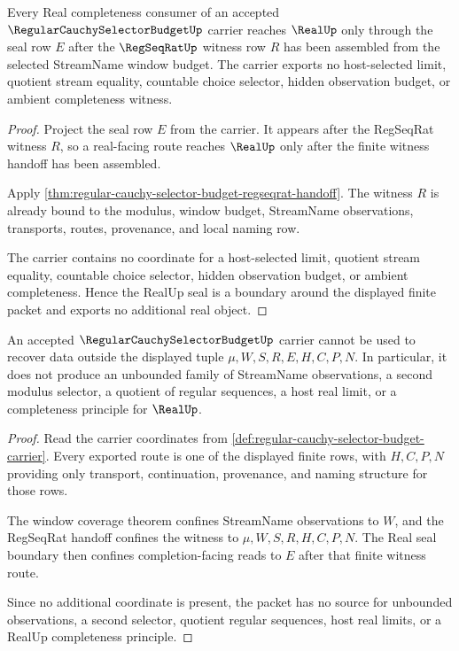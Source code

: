 \begin{theorem}
\label{thm:regular-cauchy-selector-budget-real-seal-boundary}
Every Real completeness consumer of an accepted $\RegularCauchySelectorBudgetUp$ carrier reaches $\RealUp$ only through the seal row $E$ after the $\RegSeqRatUp$ witness row $R$ has been assembled from the selected StreamName window budget. The carrier exports no host-selected limit, quotient stream equality, countable choice selector, hidden observation budget, or ambient completeness witness.
\end{theorem}
\begin{proof}
Project the seal row $E$ from the carrier. It appears after the RegSeqRat witness $R$, so a real-facing route reaches $\RealUp$ only after the finite witness handoff has been assembled.

Apply \autoref{thm:regular-cauchy-selector-budget-regseqrat-handoff}. The witness $R$ is already bound to the modulus, window budget, StreamName observations, transports, routes, provenance, and local naming row.

The carrier contains no coordinate for a host-selected limit, quotient stream equality, countable choice selector, hidden observation budget, or ambient completeness. Hence the RealUp seal is a boundary around the displayed finite packet and exports no additional real object.
\end{proof}

\begin{theorem}
\label{thm:regular-cauchy-selector-budget-nonescape}
An accepted $\RegularCauchySelectorBudgetUp$ carrier cannot be used to recover data outside the displayed tuple $\mu,W,S,R,E,H,C,P,N$. In particular, it does not produce an unbounded family of StreamName observations, a second modulus selector, a quotient of regular sequences, a host real limit, or a completeness principle for $\RealUp$.
\end{theorem}
\begin{proof}
Read the carrier coordinates from \autoref{def:regular-cauchy-selector-budget-carrier}. Every exported route is one of the displayed finite rows, with $H,C,P,N$ providing only transport, continuation, provenance, and naming structure for those rows.

The window coverage theorem confines StreamName observations to $W$, and the RegSeqRat handoff confines the witness to $\mu,W,S,R,H,C,P,N$. The Real seal boundary then confines completion-facing reads to $E$ after that finite witness route.

Since no additional coordinate is present, the packet has no source for unbounded observations, a second selector, quotient regular sequences, host real limits, or a RealUp completeness principle.
\end{proof}

